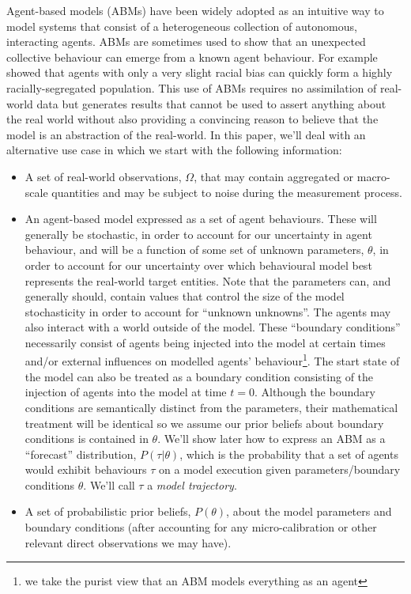 \documentclass{article}
\begin{document}
Agent-based models (ABMs) have been widely adopted as an intuitive way to model systems that consist of a heterogeneous collection of autonomous, interacting agents. ABMs are sometimes used to show that an unexpected collective behaviour can emerge from a known agent behaviour.  For example \citet{schelling1971dynamic} showed that agents with only a very slight racial bias can quickly form a highly racially-segregated population. This use of ABMs requires no assimilation of real-world data but generates results that cannot be used to assert anything about the real world without also providing a convincing reason to believe that the model is an abstraction of the real-world. In this paper, we'll deal with an alternative use case in which we start with the following information:
\begin{itemize}
\item A set of real-world observations, $\Omega$, that may contain aggregated or macro-scale quantities and may be subject to noise during the measurement process.

\item An agent-based model expressed as a set of agent behaviours. These will generally be stochastic, in order to account for our uncertainty in agent behaviour, and will be a function of some set of unknown parameters, $\theta$, in order to account for our uncertainty over which behavioural model best represents the real-world target entities. Note that the parameters can, and generally should, contain values that control the size of the model stochasticity in order to account for ``unknown unknowns''. The agents may also interact with a world outside of the model. These ``boundary conditions'' necessarily consist of agents being injected into the model at certain times and/or external influences on modelled agents' behaviour\footnote{we take the purist view that an ABM models everything as an agent}. The start state of the model can also be treated as a boundary condition consisting of the injection of agents into the model at time $t=0$. Although the boundary conditions are semantically distinct from the parameters, their mathematical treatment will be identical so we assume our prior beliefs about boundary conditions is contained in $\theta$. We'll show later how to express an ABM as a ``forecast'' distribution, $P(\tau| \theta)$, which is the probability that a set of agents would exhibit behaviours $\tau$ on a model execution given parameters/boundary conditions $\theta$. We'll call $\tau$ a \textit{model trajectory}.

\item A set of probabilistic prior beliefs, $P(\theta)$, about the model parameters and boundary conditions (after accounting for any micro-calibration or other relevant direct observations we may have). 
\end{itemize}
\end{document}
